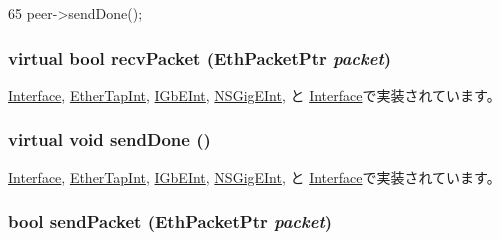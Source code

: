 \begin{DoxyCode}
65 { peer->sendDone(); }
\end{DoxyCode}
\hypertarget{classEtherInt_af3076ea966a2abda7735ea65e8a02034}{
\subsubsection[{recvPacket}]{\setlength{\rightskip}{0pt plus 5cm}virtual bool recvPacket ({\bf EthPacketPtr} {\em packet})}}
\label{classEtherInt_af3076ea966a2abda7735ea65e8a02034}


\hyperlink{classEtherLink_1_1Interface_ad54e71348f53dfb5444979e9bfaf3164}{Interface}, \hyperlink{classEtherTapInt_a9bd96a108d6f58f140c9f7d83726eebe}{EtherTapInt}, \hyperlink{classIGbEInt_a9bd96a108d6f58f140c9f7d83726eebe}{IGbEInt}, \hyperlink{classNSGigEInt_a9bd96a108d6f58f140c9f7d83726eebe}{NSGigEInt}, と \hyperlink{classSinic_1_1Interface_a9bd96a108d6f58f140c9f7d83726eebe}{Interface}で実装されています。\hypertarget{classEtherInt_a5a2f0c04ee61250a128bc992d2118390}{
\subsubsection[{sendDone}]{\setlength{\rightskip}{0pt plus 5cm}virtual void sendDone ()}}
\label{classEtherInt_a5a2f0c04ee61250a128bc992d2118390}


\hyperlink{classEtherLink_1_1Interface_aa1f5a3f61e2513049769a9ca8b16ea2d}{Interface}, \hyperlink{classEtherTapInt_a967489e0b2900f4b12d99e6257d24dbe}{EtherTapInt}, \hyperlink{classIGbEInt_a967489e0b2900f4b12d99e6257d24dbe}{IGbEInt}, \hyperlink{classNSGigEInt_a967489e0b2900f4b12d99e6257d24dbe}{NSGigEInt}, と \hyperlink{classSinic_1_1Interface_a967489e0b2900f4b12d99e6257d24dbe}{Interface}で実装されています。\hypertarget{classEtherInt_aad28edf890b463a29f87489b79f8b235}{
\subsubsection[{sendPacket}]{\setlength{\rightskip}{0pt plus 5cm}bool sendPacket ({\bf EthPacketPtr} {\em packet})}}
\label{classEtherInt_aad28edf890b463a29f87489b79f8b235}



